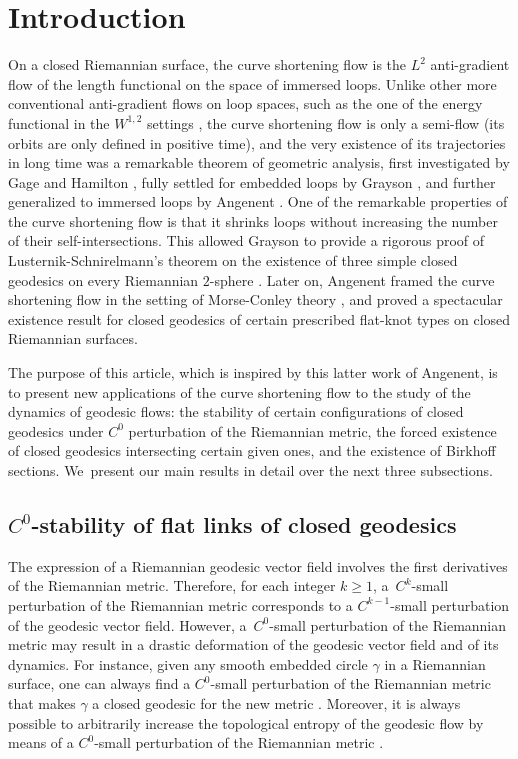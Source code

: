 \section{Introduction}

On a closed Riemannian surface, the curve shortening flow is the $L^2$ anti-gradient flow of the length functional on the space of immersed loops. Unlike other more conventional anti-gradient flows on loop spaces, such as the one of the energy functional in the $W^{1,2}$ settings \cite{Klingenberg:1978aa}, the curve shortening flow is only a semi-flow (\ie its orbits are only defined in positive time), and the very existence of its trajectories in long time was a remarkable theorem of geometric analysis, first investigated by Gage \cite{Gage:1983aa,Gage:1984aa, Gage:1990aa} and Hamilton \cite{Gage:1986aa}, fully settled for embedded loops by Grayson \cite{Grayson:1989aa}, and further generalized to immersed loops by Angenent \cite{Angenent:1990aa, Angenent:1991aa}. One of the remarkable properties of the curve shortening flow is that it shrinks loops without increasing the number of their self-intersections. This allowed Grayson to provide a rigorous proof of Lusternik-Schnirelmann's theorem on the existence of three simple closed geodesics on every Riemannian $2$-sphere \cite{Grayson:1989aa, Mazzucchelli:2018aa}. Later on, Angenent \cite{Angenent:2005aa} framed the curve shortening flow in the setting of Morse-Conley theory \cite{Conley:1978aa}, and proved a spectacular existence result for closed geodesics of certain prescribed flat-knot types on closed Riemannian surfaces.

The purpose of this article, which is inspired by this latter work of Angenent, is to present new applications of the curve shortening flow to the study of the dynamics of geodesic flows: the stability of certain configurations of closed geodesics under $C^0$ perturbation of the Riemannian metric, the forced existence of closed geodesics intersecting certain given ones, and the existence of Birkhoff sections. We~present our main results in detail over the next three subsections.

\subsection{$C^0$-stability of flat links of closed geodesics}\label{ss:C0_stability}

The expression of a Riemannian geodesic vector field involves the first derivatives of the Riemannian metric. Therefore, for each integer $k\geq1$, a~$C^k$-small perturbation of the Riemannian metric corresponds to a $C^{k-1}$-small perturbation of the geodesic vector field. However, a~$C^0$\nobreakdash-small perturbation of the Riemannian metric may result in a drastic deformation of the geodesic vector field and of its dynamics. For instance, given any smooth embedded circle $\gamma$ in a Riemannian surface, one can always find a $C^0$-small perturbation of the Riemannian metric that makes $\gamma$ a closed geodesic for the new metric \cite[Ex.\,43]{Alves:2022aa}. Moreover, it is always possible to arbitrarily increase the topological entropy of the geodesic flow by means of a $C^0$-small perturbation of the Riemannian metric \cite[Th.\,12]{Alves:2022aa}.

